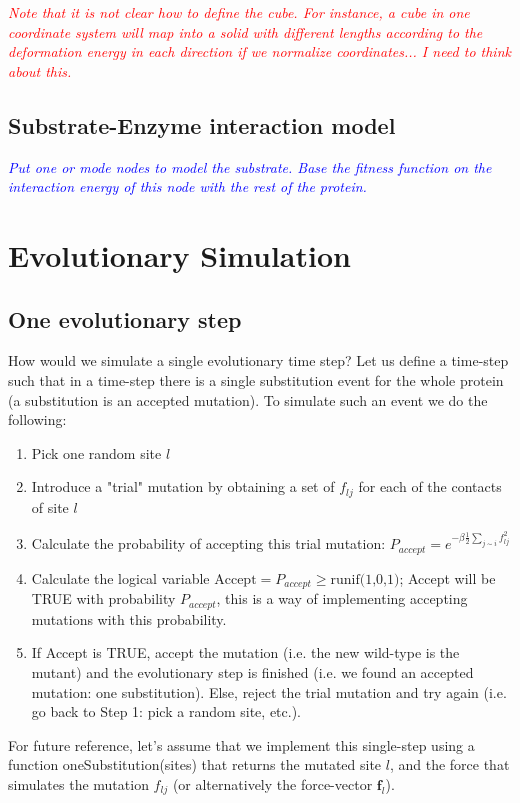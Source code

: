 \documentclass[12pt]{article}
\newcommand{\todo}[1]{\emph{\textcolor{blue} {#1}}}
\newcommand{\comment}[1]{\emph{\textcolor{red} {#1}}}
\begin{document}
\comment{Note that it is not clear how to define the cube. For instance, a cube in one coordinate system will map into a solid with different lengths according to the deformation energy in each direction if we normalize coordinates... I need to think about this.}

\subsection{Substrate-Enzyme interaction model}

\todo{Put one or mode nodes to model the substrate. Base the fitness function on the interaction energy of this node with the rest of the protein.}


\section{Evolutionary Simulation}


\subsection{One evolutionary step}

How would we simulate a single evolutionary time step? Let us define a time-step such that in a time-step there is a single substitution event for the whole protein (a substitution is an accepted mutation). To simulate such an event we do the following:
\begin{enumerate}
\item Pick one random site $l$
\item Introduce a "trial" mutation by obtaining a set of ${f_{lj}}$ for each of the contacts of site $l$
\item Calculate the probability of accepting this trial mutation: $P_{accept} = e^{-\beta \frac{1}{2} \sum_{j\sim i}  f_{lj}^2}$
\item Calculate the logical variable $\text{Accept} = P_{accept} \ge \text{runif(1,0,1)}$; Accept will be TRUE with probability $P_{accept}$, this is a way of implementing accepting mutations with this probability.
\item If Accept is TRUE, accept the mutation (i.e. the new wild-type is the mutant) and the evolutionary step is finished (i.e. we found an accepted mutation: one substitution). Else, reject the trial mutation and try again (i.e. go back to Step 1: pick a random site, etc.).
\end{enumerate}
For future reference, let's assume that we implement this single-step using a function oneSubstitution(sites) that returns the mutated site $l$, and the force that simulates the mutation ${f_{lj}}$ (or alternatively the force-vector $\mathbf{f}_l$). 
\end{document}
